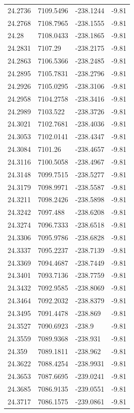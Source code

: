 \begin{table}[H]
\begin{tabular}{llll}
24.2736 & 7109.5496 & -238.1244 & -9.81 \\
24.2768 & 7108.7965 & -238.1555 & -9.81 \\
24.28 & 7108.0433 & -238.1865 & -9.81 \\
24.2831 & 7107.29 & -238.2175 & -9.81 \\
24.2863 & 7106.5366 & -238.2485 & -9.81 \\
24.2895 & 7105.7831 & -238.2796 & -9.81 \\
24.2926 & 7105.0295 & -238.3106 & -9.81 \\
24.2958 & 7104.2758 & -238.3416 & -9.81 \\
24.2989 & 7103.522 & -238.3726 & -9.81 \\
24.3021 & 7102.7681 & -238.4036 & -9.81 \\
24.3053 & 7102.0141 & -238.4347 & -9.81 \\
24.3084 & 7101.26 & -238.4657 & -9.81 \\
24.3116 & 7100.5058 & -238.4967 & -9.81 \\
24.3148 & 7099.7515 & -238.5277 & -9.81 \\
24.3179 & 7098.9971 & -238.5587 & -9.81 \\
24.3211 & 7098.2426 & -238.5898 & -9.81 \\
24.3242 & 7097.488 & -238.6208 & -9.81 \\
24.3274 & 7096.7333 & -238.6518 & -9.81 \\
24.3306 & 7095.9786 & -238.6828 & -9.81 \\
24.3337 & 7095.2237 & -238.7139 & -9.81 \\
24.3369 & 7094.4687 & -238.7449 & -9.81 \\
24.3401 & 7093.7136 & -238.7759 & -9.81 \\
24.3432 & 7092.9585 & -238.8069 & -9.81 \\
24.3464 & 7092.2032 & -238.8379 & -9.81 \\
24.3495 & 7091.4478 & -238.869 & -9.81 \\
24.3527 & 7090.6923 & -238.9 & -9.81 \\
24.3559 & 7089.9368 & -238.931 & -9.81 \\
24.359 & 7089.1811 & -238.962 & -9.81 \\
24.3622 & 7088.4254 & -238.9931 & -9.81 \\
24.3653 & 7087.6695 & -239.0241 & -9.81 \\
24.3685 & 7086.9135 & -239.0551 & -9.81 \\
24.3717 & 7086.1575 & -239.0861 & -9.81 \\

\end{tabular}
\end{table}
